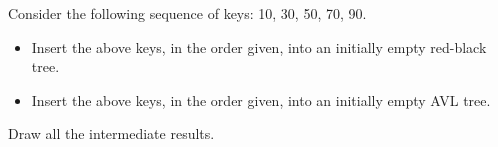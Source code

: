 Consider the following sequence of keys: 10, 30, 50, 70, 90.

\begin{itemize}

\item  Insert the above keys, in the order given, into an initially
empty red-black tree.

\item  Insert the above keys, in the order given, into an initially
empty AVL tree.

\end{itemize}

Draw all the intermediate results.
